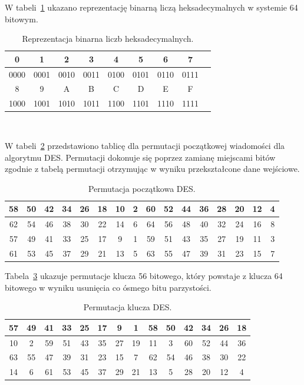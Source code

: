 \documentclass[12p]{article}
\begin{document}
W tabeli~\ref{hex_to_bin} ukazano reprezentację binarną liczą heksadecymalnych w systemie 64 bitowym.

\begin{table}[H]
\centering
\begin{tabular}{|c|c|c|c|c|c|c|c|c|}
\hline
0 & 1 & 2 & 3 & 4 & 5 & 6 & 7\\
\hline
0000 & 0001 & 0010 & 0011 & 0100 & 0101 & 0110 & 0111\\
\hline
8 & 9 & A & B & C & D & E & F\\
\hline
1000 & 1001 & 1010 & 1011 & 1100 & 1101 & 1110 & 1111\\
\hline
\end{tabular}
\caption{Reprezentacja binarna liczb heksadecymalnych.}~\label{hex_to_bin}
\end{table}

W tabeli~\ref{per_poczatkowa} przedstawiono tablicę dla permutacji początkowej wiadomości dla algorytmu DES. Permutacji dokonuje się poprzez zamianę miejscami bitów zgodnie z tabelą permutacji otrzymując w wyniku przekształcone dane wejściowe.

\begin{table}[H]
\centering
\begin{tabular}{|c|c|c|c|c|c|c|c|c|c|c|c|c|c|c|c|}
\hline
58 & 50 & 42 & 34 & 26 & 18 & 10 & 2 & 60 & 52 & 44 & 36 & 28 & 20 & 12 & 4\\
\hline
62 & 54 & 46 & 38 & 30 & 22 & 14 & 6 & 64 & 56 & 48 & 40 & 32 & 24 & 16 & 8\\
\hline
57 & 49 & 41 & 33 & 25 & 17 & 9 & 1 & 59 & 51 & 43 & 35 & 27 & 19 & 11 & 3\\
\hline
61 & 53 & 45 & 37 & 29 & 21 & 13 & 5 & 63 & 55 & 47 & 39 & 31 & 23 & 15 & 7\\
\hline
\end{tabular}
\caption{Permutacja początkowa DES.}\label{per_poczatkowa}
\end{table}

Tabela~\ref{per_klucza} ukazuje permutacje klucza 56 bitowego, który powstaje z klucza 64 bitowego w wyniku usunięcia co ósmego bitu parzystości.%

\begin{table}[H]
\centering
\begin{tabular}{|c|c|c|c|c|c|c|c|c|c|c|c|c|c|}
\hline
57 & 49 & 41 & 33 & 25 & 17 & 9 & 1 & 58 & 50 & 42 & 34 & 26 & 18\\
\hline
10 & 2 & 59 & 51 & 43 & 35 & 27 & 19 & 11 & 3 & 60 & 52 & 44 & 36\\
\hline
63 & 55 & 47 & 39 & 31 & 23 & 15 & 7 & 62 & 54 & 46 & 38 & 30 & 22\\
\hline
14 & 6 & 61 & 53 & 45 & 37 & 29 & 21 & 13 & 5 & 28 & 20 & 12 & 4 \\
\hline
\end{tabular}
\caption{Permutacja klucza DES.}~\label{per_klucza}
\end{table}
 
\end{document}
